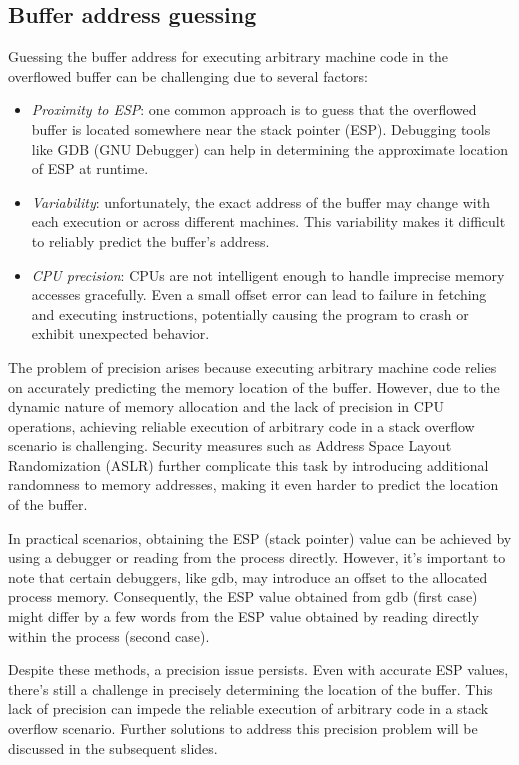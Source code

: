 \subsection{Buffer address guessing}
Guessing the buffer address for executing arbitrary machine code in the overflowed buffer can be challenging due to several factors:
\begin{itemize}
    \item \textit{Proximity to ESP}: one common approach is to guess that the overflowed buffer is located somewhere near the stack pointer (ESP). 
        Debugging tools like GDB (GNU Debugger) can help in determining the approximate location of ESP at runtime.
    \item \textit{Variability}: unfortunately, the exact address of the buffer may change with each execution or across different machines. 
        This variability makes it difficult to reliably predict the buffer's address.
    \item \textit{CPU precision}: CPUs are not intelligent enough to handle imprecise memory accesses gracefully. 
        Even a small offset error can lead to failure in fetching and executing instructions, potentially causing the program to crash or exhibit unexpected behavior.
\end{itemize}
The problem of precision arises because executing arbitrary machine code relies on accurately predicting the memory location of the buffer. 
However, due to the dynamic nature of memory allocation and the lack of precision in CPU operations, achieving reliable execution of arbitrary code in a stack overflow scenario is challenging.
Security measures such as Address Space Layout Randomization (ASLR) further complicate this task by introducing additional randomness to memory addresses, making it even harder to predict the location of the buffer.

In practical scenarios, obtaining the ESP (stack pointer) value can be achieved by using a debugger or reading from the process directly. 
However, it's important to note that certain debuggers, like gdb, may introduce an offset to the allocated process memory. 
Consequently, the ESP value obtained from gdb (first case) might differ by a few words from the ESP value obtained by reading directly within the process (second case).

Despite these methods, a precision issue persists. 
Even with accurate ESP values, there's still a challenge in precisely determining the location of the buffer. 
This lack of precision can impede the reliable execution of arbitrary code in a stack overflow scenario. 
Further solutions to address this precision problem will be discussed in the subsequent slides.

